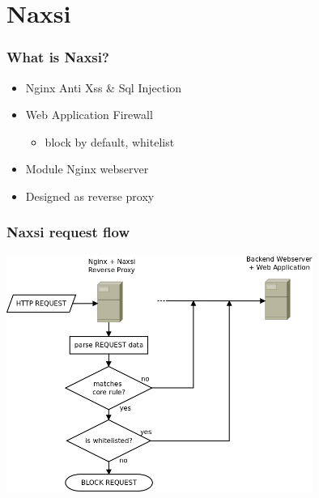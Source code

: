 \section{Naxsi}

\begin{frame}
  \frametitle{What is Naxsi?}
   \begin{itemize}
   \item Nginx Anti Xss \& Sql Injection
   \item Web Application Firewall
   \begin{itemize}
        \item block by default, whitelist
   \end{itemize}
   \item Module Nginx webserver
   \item Designed as reverse proxy
  \end{itemize}
\end{frame}

\begin{frame}
  \frametitle{Naxsi request flow}
    \begin{center} 
      \includegraphics[width=0.75\textwidth]{../paper/images/request_flow.png}
    \end{center}
\end{frame}


